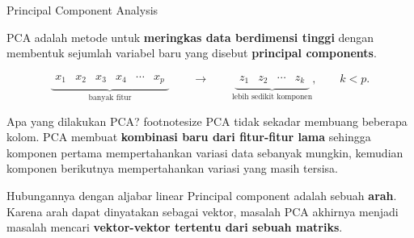 \documentclass[aspectratio=169,11pt]{beamer}
\begin{document}
\begin{frame}{Principal Component Analysis}

PCA adalah metode untuk \textbf{meringkas data berdimensi tinggi}
dengan membentuk sejumlah variabel baru yang disebut
\textbf{principal components}.

\pause

\begin{center}
\[
\underbrace{
\begin{matrix}
x_1 & x_2 & x_3 & x_4 & \cdots & x_p
\end{matrix}}_{\text{banyak fitur}}
\qquad
\longrightarrow
\qquad
\underbrace{
\begin{matrix}
z_1 & z_2 & \cdots & z_k
\end{matrix}}_{\text{lebih sedikit komponen}},
\qquad k<p.
\]
\end{center}

\pause

\begin{block}{\footnotesize Apa yang dilakukan PCA?}
footnotesize  PCA tidak sekadar membuang beberapa kolom. PCA membuat \textbf{kombinasi baru dari fitur-fitur lama} sehingga komponen pertama mempertahankan variasi data sebanyak mungkin,
kemudian komponen berikutnya mempertahankan variasi yang masih tersisa.
\end{block}

\pause

\begin{alertblock}{\footnotesize Hubungannya dengan aljabar linear}
\footnotesize  Principal component adalah sebuah \textbf{arah}. Karena arah dapat dinyatakan sebagai vektor,
masalah PCA akhirnya menjadi masalah mencari
\textbf{vektor-vektor tertentu dari sebuah matriks}.
\end{alertblock}

\end{frame}
\end{document}
